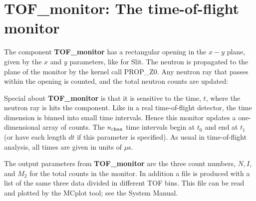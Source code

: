 
\section{TOF\_monitor: The time-of-flight monitor}

The component {\bf TOF\_monitor} has a rectangular opening
in the $x-y$ plane, given by the $x$ and $y$ parameters,
like for {\rm Slit}. 
The neutron is propagated to the plane of the monitor
by the kernel call PROP\_Z0.
Any neutron ray that passes within the opening is counted, and
the total neutron counts are updated:

Special about {\bf TOF\_monitor} is that it is sensitive to
the time, $t$, where the neutron ray is hits the component.
Like in a real time-of-flight detector, the time dimension is
binned into small time intervals. 
Hence this monitor updates a one-dimensional array of counts.
The $n_{\rm chan}$ time intervals begin at $t_0$ and 
end at $t_1$ (or have each length $dt$ if this parameter is specified). 
As usual in time-of-flight analysis, all times are given in units of $\mu$s.

The output parameters from {\bf TOF\_monitor} are the three count numbers, 
$N, I$, and $M_2$ for the total counts in the monitor.
In addition a file is produced with a list of the same three data divided in
different TOF bins.
This file can be read and plotted by the {\rm MCplot} tool; see the
System Manual.

